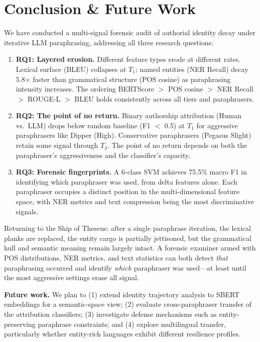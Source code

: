 \section{Conclusion \& Future Work}

We have conducted a multi-signal forensic audit of authorial identity decay under iterative LLM paraphrasing, addressing all three research questions:

\begin{enumerate}
    \item \textbf{RQ1: Layered erosion.} Different feature types erode at different rates. Lexical surface (BLEU) collapses at $T_1$; named entities (NER Recall) decay 5.8$\times$ faster than grammatical structure (POS cosine) as paraphrasing intensity increases. The ordering BERTScore $>$ POS cosine $>$ NER Recall $>$ ROUGE-L $>$ BLEU holds consistently across all tiers and paraphrasers.
    \item \textbf{RQ2: The point of no return.} Binary authorship attribution (Human vs.\ LLM) drops below random baseline (F1 $<$ 0.5) at $T_1$ for aggressive paraphrasers like Dipper (High). Conservative paraphrasers (Pegasus Slight) retain some signal through $T_3$. The point of no return depends on both the paraphraser's aggressiveness and the classifier's capacity.
    \item \textbf{RQ3: Forensic fingerprints.} A 6-class SVM achieves 75.5\% macro F1 in identifying which paraphraser was used, from delta features alone. Each paraphraser occupies a distinct position in the multi-dimensional feature space, with NER metrics and text compression being the most discriminative signals.
\end{enumerate}

Returning to the Ship of Theseus: after a single paraphrase iteration, the lexical planks are replaced, the entity cargo is partially jettisoned, but the grammatical hull and semantic meaning remain largely intact. A forensic examiner armed with POS distributions, NER metrics, and text statistics can both detect \emph{that} paraphrasing occurred and identify \emph{which} paraphraser was used---at least until the most aggressive settings erase all signal.

\textbf{Future work.} We plan to (1) extend identity trajectory analysis to SBERT embeddings for a semantic-space view; (2) evaluate cross-paraphraser transfer of the attribution classifiers; (3) investigate defense mechanisms such as entity-preserving paraphrase constraints; and (4) explore multilingual transfer, particularly whether entity-rich languages exhibit different resilience profiles.
